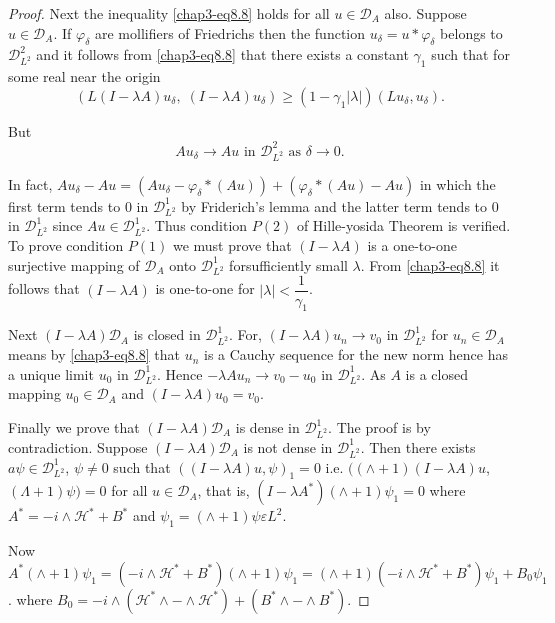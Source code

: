 \begin{proof}
Next the inequality \eqref{chap3-eq8.8} holds for all $u \in \mathscr{D}_A$
also. Suppose $u \in \mathscr{D}_A$. If $\varphi_{\delta}$ are
mollifiers of Friedrichs then the function $u_{\delta} = u *
\varphi_{\delta}$ belongs to $\mathscr{D}^2_{L^{2}}$ and it follows
from \eqref{chap3-eq8.8} that there exists a constant $\gamma_1$ such
that for some real near the origin  
$$
(L(I - \lambda A) u_{\delta}, \; (I - \lambda A)u_{\delta}) \geq (1 -
\gamma_1 | \lambda |) ( L u_{\delta}, u_{\delta}). 
$$

But
$$
Au_{\delta} \to Au \text{ in } \mathscr{D}^2_{L^{2}} \text{ as }
\delta \to 0. 
$$

In fact, $Au_{\delta} - Au = (Au_{\delta} - \varphi_{\delta} * (A u))
+ (\varphi_{\delta}* (Au) - Au)$ in which the first term tends to 0 in
$\mathscr{D}^1_{L^{2}}$ by Friderich's lemma and the latter term tends
to 0 in $\mathscr{D}^1_{L^{2}}$ since $A u \in
\mathscr{D}^1_{L^{2}}$. Thus condition $P(2)$ of Hille-yosida Theorem is
verified. To prove condition $P(1)$ we must prove that $(I - \lambda A)$
is a one-to-one surjective mapping of $\mathscr{D}_A$ onto
$\mathscr{D}^1_{L^{2}}$ for\pageoriginale sufficiently small
$\lambda$. From \eqref{chap3-eq8.8} it follows that $(I - \lambda A)$
is one-to-one
for $| \lambda | < \dfrac{1}{\gamma_1}$.  

Next $(I - \lambda A) \mathscr{D}_A$ is closed in
$\mathscr{D}^1_{L^{2}}$. For, $(I - \lambda A) u_n \to v_0$ in
$\mathscr{D}^1_{L^{2}}$ for $u_n \in \mathscr{D}_A$ means by
\eqref{chap3-eq8.8} that $u_n$ is a Cauchy sequence for the new norm
hence has a unique limit $u_0$ in $\mathscr{D}^1_{L^{2}}$. Hence $-
\lambda Au_{n} \to v_0 - u_0$ in $\mathscr{D}^1_{L^{2}}$. As $A$ is a
closed mapping $u_0 \in \mathscr{D}_A$ and $(I - \lambda A) u_0 = v_0$. 

Finally we prove that $(I - \lambda A) \mathscr{D}_A$ is dense in
$\mathscr{D}^1_{L^{2}}$. The proof is by contradiction. Suppose $(I -
\lambda A) \mathscr{D}_A$ is not dense in
$\mathscr{D}^1_{L^{2}}$. Then there exists $a \psi \in
\mathscr{D}^1_{L^{2}}$, $\psi \neq 0$ such that $(( I - \lambda A)u,
\psi)_1 = 0$ i.e. $(( \wedge + 1) (I - \lambda A)u$, $(\Lambda + 1)
\psi) = 0$ for all $u \in \mathscr{D}_A$, that is, $(I - \lambda A^*)
(\wedge + 1) \psi_1 =0$ 
where $A^* = - i \wedge \mathscr{H}^* + B^* $ and $\psi_1 = (\wedge +
1) \psi \varepsilon L^2$. 

Now $A^* (\wedge + 1) \psi_1 = (-i \wedge \mathscr{H}^* + B^*)(\wedge
+ 1) \psi_{1} = (\wedge + 1) (-i \wedge \mathscr{H}^* + B^*) \psi_1 + B_0
\psi_1$. 
where $B_0 = -i \wedge (\mathscr{H}^* \wedge - \wedge \mathscr{H}^*) +
(B^* \wedge - \wedge B^*)$. 


\end{proof}
